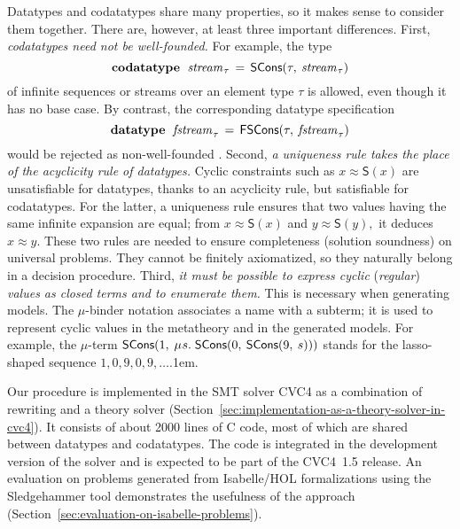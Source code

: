 \documentclass[smallcondensed,draft]{svjour3}
\newcommand\MU{\vvthinspace\mu\vvthinspace}
\newcommand\afterLdots{\kern.1em} %
\newcommand\cpp{C\nobreak\raisebox{.05ex}{+}\nobreak\raisebox{.05ex}{+}}
\newcommand\keyw[1]{\textbf{#1}}
\newcommand\const[1]{\textsf{#1}}
\newcommand\ty[1]{\textit{#1}}
\newcommand{\teq}{\approx}
\newcommand\vvthinspace{\kern+0.041667em}
\newcommand\vthinspace{\kern+0.083333em}
\begin{document}
Datatypes and codatatypes share many properties, so it makes sense
to consider them together. There are, however, at least three important
differences.
%
First, \emph{codatatypes need not be well-founded.}
For example, the type
$$\vthinspace\keyw{codatatype}~\;\ty{stream}_{\vthinspace\tau} \,=\allowbreak\, \const{SCons}(\tau,\allowbreak\: \ty{stream}_{\vthinspace\tau})\vthinspace$$
of infinite sequences or streams over an element type $\tau$ is
allowed, even though it has no base case. By contrast, the
corresponding datatype specification
$$\vthinspace\keyw{datatype}~\;\ty{fstream}_{\vthinspace\tau} \,=\allowbreak\, \const{FSCons}(\tau,\allowbreak\: \ty{fstream}_{\vthinspace\tau})\vthinspace$$
would be rejected as non-well-founded
\cite{blanchette-et-al-2015-esop}.
%
Second, \emph{a uniqueness rule takes the place of the acyclicity rule of datatypes.}
Cyclic constraints such as
$x \teq \const{S}(x)$ %
are unsatisfiable for datatypes,
thanks to an acyclicity rule,
but satisfiable for codatatypes.
For the latter, a uniqueness rule ensures that two values
having the same infinite expansion are equal; from $x
\teq \const{S}(x)$ and
$y \teq \const{S}(y),$ it deduces $x \teq y.$
These two rules are needed to ensure completeness
(solution soundness) on universal problems. %
They cannot be finitely axiomatized, so they naturally belong in
a decision procedure.
%
Third, \emph{it must be possible to express cyclic }(\emph{regular}) \emph{values as closed terms and
to enumerate them.} This is necessary when generating models.
The $\mu$-binder notation associates a name with
a subterm; it is used to represent cyclic values in the metatheory and
in the generated models. For example,
the $\mu$-term $\const{SCons}(1,\: \MU s.\; \const{SCons}(0,\: \const{SCons}(9,\: s)))$
stands for the lasso-shaped sequence $1, 0, 9, 0, 9, %
\ldots$\afterLdots.


Our procedure is implemented in the SMT solver CVC4 \cite{barrett-et-al-2011} as a combination
of rewriting and a theory solver (Section~\ref{sec:implementation-as-a-theory-solver-in-cvc4}).
It consists of about 2000 lines of \cpp{} code,
most of which are shared between datatypes and codatatypes. The code is
integrated in the development version of the solver and is expected to be part
of the CVC4~1.5 release.
%
An evaluation on %
problems generated from Isabelle/HOL \cite{nipkow-et-al-2002}
formalizations using the Sledgehammer tool \cite{blanchette-et-al-2013-smt}
demonstrates the usefulness of the approach (Section~\ref{sec:evaluation-on-isabelle-problems}).
\end{document}
